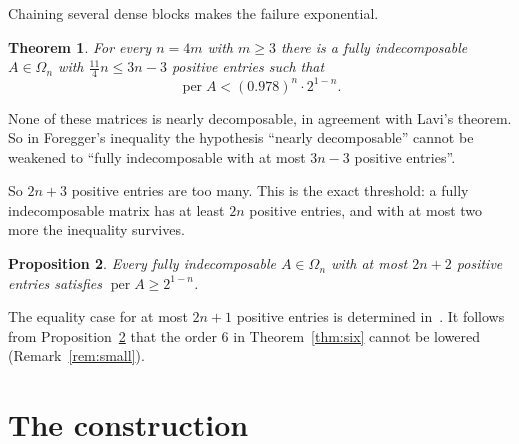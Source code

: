 \documentclass[11pt]{amsart}
\newtheorem{theorem}{Theorem}
\newtheorem{proposition}[theorem]{Proposition}
\theoremstyle{remark}
\DeclareMathOperator{\per}{per}
\begin{document}
Chaining several dense blocks makes the failure exponential.

\begin{theorem}\label{thm:exp}
For every $n=4m$ with $m\ge3$ there is a fully indecomposable $A\in\Omega_n$
with $\frac{11}{4}n\le3n-3$ positive entries such that
\[
  \per A<(0.978)^{n}\cdot2^{1-n}.
\]
\end{theorem}

None of these matrices is nearly decomposable, in agreement with Lavi's
theorem. So in Foregger's inequality the hypothesis ``nearly decomposable''
cannot be weakened to ``fully indecomposable with at most $3n-3$ positive
entries''.

So $2n+3$ positive entries are too many. This is the exact threshold: a fully
indecomposable matrix has at least $2n$ positive entries, and with at most two
more the inequality survives.

\begin{proposition}\label{prop:threshold}
Every fully indecomposable $A\in\Omega_n$ with at most $2n+2$ positive entries
satisfies $\per A\ge2^{1-n}$.
\end{proposition}

The equality case for at most $2n+1$ positive entries is determined
in~\cite{FirstGap}. It follows from Proposition~\ref{prop:threshold} that the
order $6$ in Theorem~\ref{thm:six} cannot be lowered (Remark~\ref{rem:small}).

\section{The construction}
\end{document}
